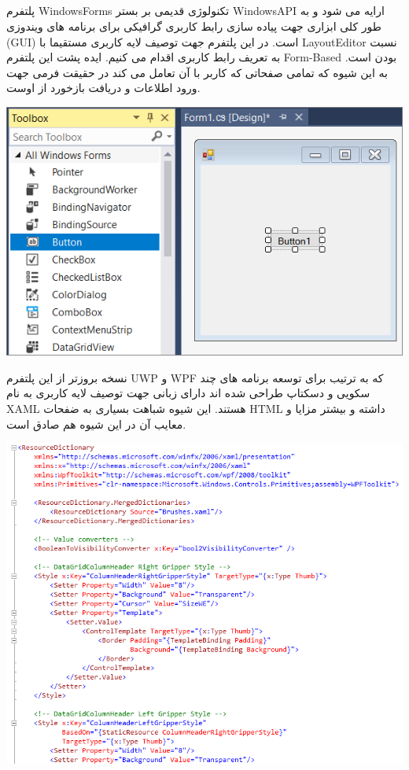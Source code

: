 \documentclass{CSICC2020}
\begin{document}
\subsection{}
پلتفرم WindowsForms تکنولوژی قدیمی بر بستر WindowsAPI ارایه می شود و به طور کلی ابزاری جهت پیاده سازی رابط کاربری گرافیکی برای برنامه های ویندوزی (GUI) است.
در این پلتفرم جهت توصیف لایه کاربری مستقیما با LayoutEditor نسبت به تعریف رابط کاربری اقدام می کنیم.
ایده پشت این پلتفرم Form-Based بودن است. به این شیوه که تمامی صفحاتی که کاربر با آن تعامل می کند در حقیقت فرمی جهت ورود اطلاعات و دریافت بازخورد از اوست.

\includegraphics[width=\linewidth]{./Images/winform}

نسخه بروزتر از این پلتفرم UWP و WPF که به ترتیب برای توسعه برنامه های چند سکویی و دسکتاپ طراحی شده اند دارای زبانی جهت توصیف لایه کاربری به نام XAML هستند.
 این شیوه شباهت بسیاری به ضفحات HTML داشته و بیشتر مزایا و معایب آن در این شیوه هم صادق است.

\includegraphics[width=\linewidth]{./Images/xaml}
\end{document}
